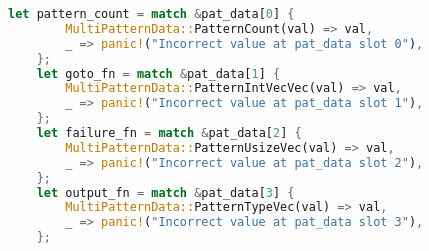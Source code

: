 \begin{lstlisting}[language=Rust,caption={Rust unpacking of pattern data (Aho-Corasick)},label={lst:rust_unpack},showstringspaces=false]
    let pattern_count = match &pat_data[0] {
        MultiPatternData::PatternCount(val) => val,
        _ => panic!("Incorrect value at pat_data slot 0"),
    };
    let goto_fn = match &pat_data[1] {
        MultiPatternData::PatternIntVecVec(val) => val,
        _ => panic!("Incorrect value at pat_data slot 1"),
    };
    let failure_fn = match &pat_data[2] {
        MultiPatternData::PatternUsizeVec(val) => val,
        _ => panic!("Incorrect value at pat_data slot 2"),
    };
    let output_fn = match &pat_data[3] {
        MultiPatternData::PatternTypeVec(val) => val,
        _ => panic!("Incorrect value at pat_data slot 3"),
    };
\end{lstlisting}
